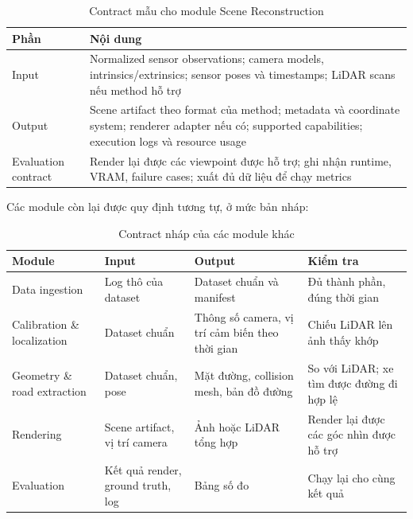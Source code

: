 \begin{table}[H]
  \centering
  \caption{Contract mẫu cho module Scene Reconstruction}
  \begin{tabularx}{\linewidth}{l X}
    \toprule
    \textbf{Phần} & \textbf{Nội dung} \\
    \midrule
    Input & Normalized sensor observations; camera models, intrinsics/extrinsics; sensor poses và timestamps; LiDAR scans nếu method hỗ trợ \\
    \addlinespace
    Output & Scene artifact theo format của method; metadata và coordinate system; renderer adapter nếu có; supported capabilities; execution logs và resource usage \\
    \addlinespace
    Evaluation contract & Render lại được các viewpoint được hỗ trợ; ghi nhận runtime, VRAM, failure cases; xuất đủ dữ liệu để chạy metrics \\
    \bottomrule
  \end{tabularx}
\end{table}

Các module còn lại được quy định tương tự, ở mức bản nháp:

\begin{table}[H]
  \centering
  \small
  \caption{Contract nháp của các module khác}
  \begin{tabularx}{\linewidth}{>{\raggedright\arraybackslash}p{3cm} >{\raggedright\arraybackslash}X >{\raggedright\arraybackslash}X >{\raggedright\arraybackslash}X}
    \toprule
    \textbf{Module} & \textbf{Input} & \textbf{Output} & \textbf{Kiểm tra} \\
    \midrule
    Data ingestion & Log thô của dataset & Dataset chuẩn và manifest & Đủ thành phần, đúng thời gian \\
    \addlinespace
    Calibration \& localization & Dataset chuẩn & Thông số camera, vị trí cảm biến theo thời gian & Chiếu LiDAR lên ảnh thấy khớp \\
    \addlinespace
    Geometry \& road extraction & Dataset chuẩn, pose & Mặt đường, collision mesh, bản đồ đường & So với LiDAR; xe tìm được đường đi hợp lệ \\
    \addlinespace
    Rendering & Scene artifact, vị trí camera & Ảnh hoặc LiDAR tổng hợp & Render lại được các góc nhìn được hỗ trợ \\
    \addlinespace
    Evaluation & Kết quả render, ground truth, log & Bảng số đo & Chạy lại cho cùng kết quả \\
    \bottomrule
  \end{tabularx}
\end{table}

